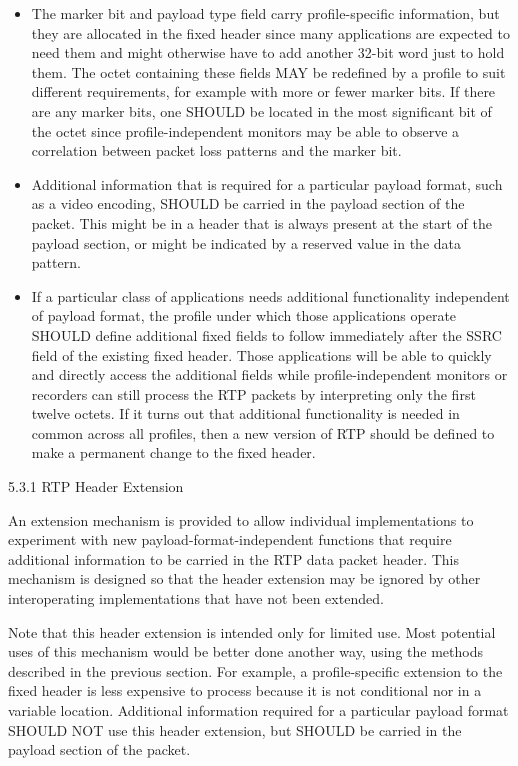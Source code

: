 \documentclass{article}
\begin{document}
\begin{itemize}
\item The marker bit and payload type field carry profile-specific information, but they are allocated in the fixed header since many applications are expected to need them and might otherwise have to add another 32-bit word just to hold them.  The octet containing these fields MAY be redefined by a profile to suit different requirements, for example with more or fewer marker bits.  If there are any marker bits, one SHOULD be located in the most significant bit of the octet since profile-independent monitors may be able to observe a correlation between packet loss patterns and the marker bit.
\item Additional information that is required for a particular payload format, such as a video encoding, SHOULD be carried in the payload section of the packet.  This might be in a header that is always present at the start of the payload section, or might be indicated by a reserved value in the data pattern.
\item If a particular class of applications needs additional functionality independent of payload format, the profile under which those applications operate SHOULD define additional fixed fields to follow immediately after the SSRC field of the existing fixed header.  Those applications will be able to quickly and directly access the additional fields while profile-independent monitors or recorders can still process the RTP packets by interpreting only the first twelve octets.
If it turns out that additional functionality is needed in common across all profiles, then a new version of RTP should be defined to make a permanent change to the fixed header.

\end{itemize}
5.3.1 RTP Header Extension

An extension mechanism is provided to allow individual implementations to experiment with new payload-format-independent functions that require additional information to be carried in the RTP data packet header.  This mechanism is designed so that the header extension may be ignored by other interoperating implementations that have not been extended.

Note that this header extension is intended only for limited use. Most potential uses of this mechanism would be better done another way, using the methods described in the previous section.  For example, a profile-specific extension to the fixed header is less expensive to process because it is not conditional nor in a variable location.  Additional information required for a particular payload format SHOULD NOT use this header extension, but SHOULD be carried in the payload section of the packet.
\end{document}
